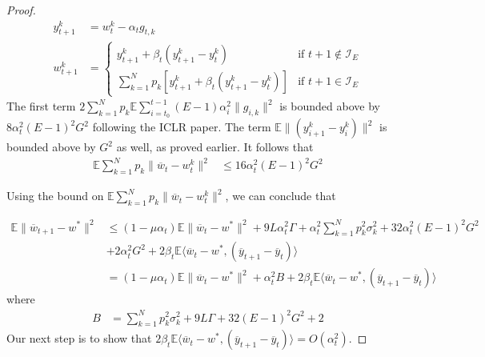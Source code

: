 \begin{proof}
	\begin{align*}
	y_{t+1}^{k} & =w_{t}^{k}-\alpha_{t}g_{t,k}\\
	w_{t+1}^{k} & =\begin{cases}
	y_{t+1}^{k}+\beta_{t}(y_{t+1}^{k}-y_{t}^{k}) & \text{if }t+1\notin\mathcal{I}_{E}\\
	\sum_{k=1}^{N}p_{k}\left[y_{t+1}^{k}+\beta_{t}(y_{t+1}^{k}-y_{t}^{k})\right] & \text{if }t+1\in\mathcal{I}_{E}
	\end{cases}
	\end{align*}
	The first term $2\sum_{k=1}^{N}p_{k}\mathbb{E}\sum_{i=t_{0}}^{t-1}(E-1)\alpha_{i}^{2}\|g_{i,k}\|^{2}$
	is bounded above by $8\alpha_{t}^{2}(E-1)^{2}G^{2}$ following the
	ICLR paper. The term $\mathbb{E}\|(y_{i+1}^{k}-y_{i}^{k})\|^{2}$
	is bounded above by $G^{2}$ as well, as proved earlier. It follows
	that 
	\begin{align*}
	\mathbb{E}\sum_{k=1}^{N}p_{k}\|\overline{w}_{t}-w_{t}^{k}\|^{2} & \leq16\alpha_{t}^{2}(E-1)^{2}G^{2}
	\end{align*}
	
	Using the bound on $\mathbb{E}\sum_{k=1}^{N}p_{k}\|\overline{w}_{t}-w_{t}^{k}\|^{2}$,
	we can conclude that 
	
	\begin{align*}
	\mathbb{E}\|\overline{w}_{t+1}-w^{\ast}\|^{2} & \leq(1-\mu\alpha_{t})\mathbb{E}\|\overline{w}_{t}-w^{\ast}\|^{2}+9L\alpha_{t}^{2}\Gamma+\alpha_{t}^{2}\sum_{k=1}^{N}p_{k}^{2}\sigma_{k}^{2}+32\alpha_{t}^{2}(E-1)^{2}G^{2}\\
	& +2\alpha_{t}^{2}G^{2}+2\beta_{t}\mathbb{E}\langle\overline{w}_{t}-w^{\ast},(\overline{y}_{t+1}-\overline{y}_{t})\rangle\\
	& =(1-\mu\alpha_{t})\mathbb{E}\|\overline{w}_{t}-w^{\ast}\|^{2}+\alpha_{t}^{2}B+2\beta_{t}\mathbb{E}\langle\overline{w}_{t}-w^{\ast},(\overline{y}_{t+1}-\overline{y}_{t})\rangle
	\end{align*}
	where 
	\begin{align*}
	B & =\sum_{k=1}^{N}p_{k}^{2}\sigma_{k}^{2}+9L\Gamma+32(E-1)^{2}G^{2}+2
	\end{align*}
	Our next step is to show that $2\beta_{t}\mathbb{E}\langle\overline{w}_{t}-w^{\ast},(\overline{y}_{t+1}-\overline{y}_{t})\rangle=O(\alpha_{t}^{2})$. 
	

\end{proof}
